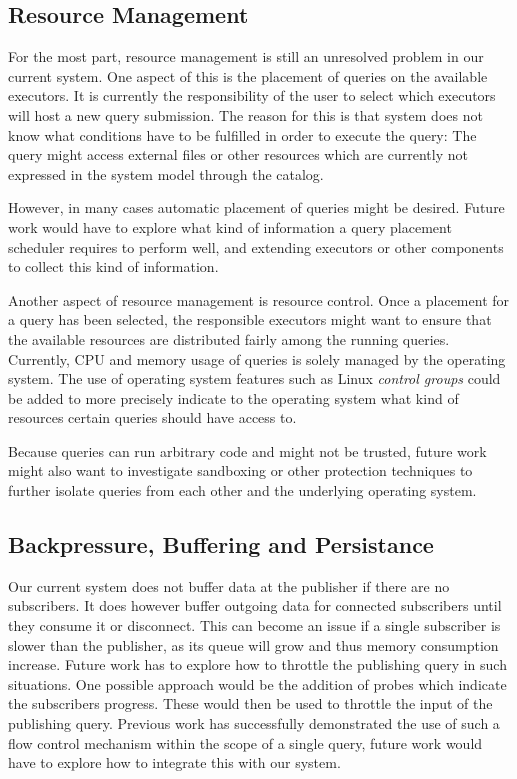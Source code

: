 \subsection{Resource Management}

For the most part, resource management is still an unresolved problem in our
current system. One aspect of this is the placement of queries on the available
executors. It is currently the responsibility of the user to select which executors
will host a new query submission.
The reason for this is that system does not know what conditions have to be
fulfilled in order to execute the query:
The query might access external files or other resources which are currently not
expressed in the system model through the catalog.

However, in many cases automatic placement of queries might be desired. Future
work would have to explore what kind of information a query placement scheduler
requires to perform well, and extending executors or other components to collect
this kind of information.

Another aspect of resource management is resource control. Once a placement
for a query has been selected, the responsible executors might want to ensure
that the available resources are distributed fairly among the
running queries. Currently, CPU and memory usage of queries is solely managed
by the operating system. The use of operating system features such as
Linux \emph{control groups} \cite{cgroups} could be added to more precisely indicate
to the operating system what kind of resources certain queries should have
access to.

Because queries can run arbitrary code and might not be trusted,
future work might also want to investigate sandboxing or other protection
techniques to further isolate queries from each other and the underlying operating
system.

\subsection{Backpressure, Buffering and Persistance}

Our current system does not buffer data at the publisher if there are no
subscribers. It does however buffer outgoing data for connected subscribers
until they consume it or disconnect. This can become an issue if a single
subscriber is slower than the publisher, as its queue will grow and thus
memory consumption increase. Future work has to explore how to throttle
the publishing query in such situations. One possible approach would be the
addition of probes which indicate the subscribers progress. These would then
be used to throttle the input of the publishing query. Previous work \cite{faucet} has
successfully demonstrated the use of such a flow control mechanism within the
scope of a single query, future work would have to explore how to integrate
this with our system.

